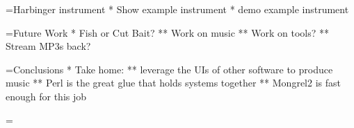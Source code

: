 \documentclass[titlepage,usenames,a4,landscape,semhelv]{seminar}
\begin{document}
\begin{slide}
=Harbinger instrument
* Show example instrument
* demo example instrument

=Future Work
* Fish or Cut Bait?
** Work on music
** Work on tools?
** Stream MP3s back?

=Conclusions
* Take home:
** leverage the UIs of other software to produce music
** Perl is the great glue that holds systems together
** Mongrel2 is fast enough for this job



=
\end{slide}
\end{document}

